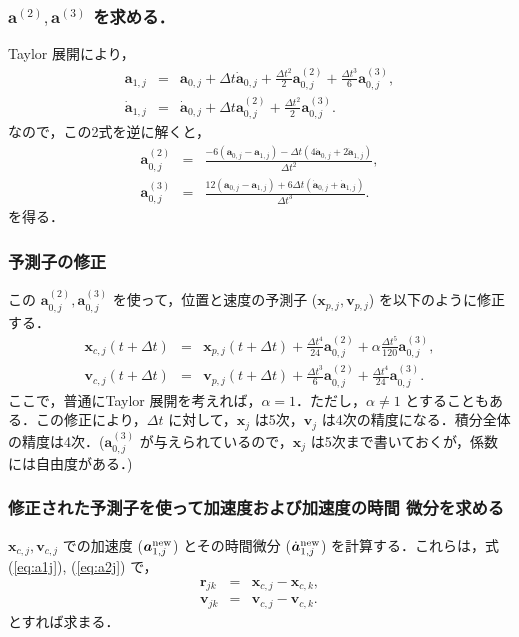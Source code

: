 \documentclass[11pt,a4paper,oneside,onecolumn]{jarticle}
\begin{document}
\subsubsection{${\bm a}^{(2)}, {\bm a}^{(3)}$ を求める．\label{sec:corrector}}
Taylor 展開により，
\begin{eqnarray}
{\bm a}_{1,j} & = & {\bm a}_{0,j} + \Delta t \dot{{\bm a}}_{0,j} + \frac{\Delta t ^2}{2} {\bm a}_{0,j}^{(2)} + \frac{\Delta t ^3}{6} {\bm a}_{0,j}^{(3)}, \\
\dot{{\bm a}}_{1,j} & = & \dot{{\bm a}}_{0,j} + \Delta t {\bm a}_{0,j}^{(2)} + \frac{\Delta t ^2}{2} {\bm a}_{0,j}^{(3)}. 
\end{eqnarray}
なので，この2式を逆に解くと，
\begin{eqnarray}
{\bm a}_{0,j}^{(2)} & = & \frac{- 6 ({\bm a}_{0,j} - {\bm a}_{1,j}) - \Delta t (4 \dot{{\bm a}}_{0,j} + 2 \dot{{\bm a}}_{1,j})}{\Delta t ^2}, \\
{\bm a}_{0,j}^{(3)} & = & \frac{12 ({\bm a}_{0,j} - {\bm a}_{1,j}) + 6 \Delta t (\dot{{\bm a}}_{0,j} + \dot{{\bm a}}_{1,j})}{\Delta t ^3}. 
\end{eqnarray}
を得る．

\subsubsection{予測子の修正}
この ${\bm a}_{0,j}^{(2)}, {\bm a}_{0,j}^{(3)}$ を使って，位置と速度の予測子 (${\bm x}_{p,j}, {\bm v}_{p,j}$) を以下のように修正する．
\begin{eqnarray}
{\bm x}_{c,j} (t + \Delta t) & = & {\bm x}_{p,j} (t + \Delta t) +  \frac{\Delta t ^4}{24} {\bm a}_{0,j}^{(2)} + \alpha \frac{\Delta t ^5}{120} {\bm a}_{0,j}^{(3)}, \\
{\bm v}_{c,j} (t + \Delta t) & = & {\bm v}_{p,j} (t +\Delta t) + \frac{\Delta t ^3}{6} {\bm a}_{0,j}^{(2)} + \frac{\Delta t ^4}{24} {\bm a}_{0,j}^{(3)}. 
\end{eqnarray}
ここで，普通にTaylor 展開を考えれば，$\alpha = 1$．ただし，$\alpha \not= 1$ とすることもある．この修正により，$\Delta t$ に対して，${\bm x}_j$ は5次，${\bm v}_j$ は4次の精度になる．積分全体の精度は4次．(${\bm a}_{0,j}^{(3)}$ が与えられているので，${\bm x}_j$ は5次まで書いておくが，係数には自由度がある．)

\subsubsection{修正された予測子を使って加速度および加速度の時間
微分を求める}
${\bm x}_{c,j}, {\bm v}_{c,j}$ での加速度 (${\bm a}_{1,j}^{\rm new}$) とその時間微分 ($\dot{{\bm a}}_{1,j}^{\rm new}$) を計算する．これらは，式 (\ref{eq:a1j}), (\ref{eq:a2j}) で，
\begin{eqnarray}
{\bm r}_{jk} & = & {\bm x}_{c,j} - {\bm x}_{c,k}, \\
{\bm v}_{jk} & = & {\bm v}_{c,j} - {\bm v}_{c,k}. 
\end{eqnarray}
とすれば求まる．
\end{document}
